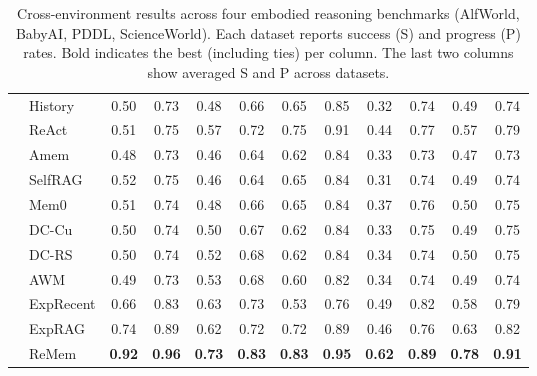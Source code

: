 \begin{table}[t!]
{\begin{tabular}{l l cc cc cc cc cc}
 & History & 0.50 & 0.73 & 0.48 & 0.66 & 0.65 & 0.85 & 0.32 & 0.74 & 0.49 & 0.74 \\
\cmidrule(lr){2-12}
 & ReAct & 0.51 & 0.75 & 0.57 & 0.72 & 0.75 & 0.91 & 0.44 & 0.77 & 0.57 & 0.79 \\
 & Amem & 0.48 & 0.73 & 0.46 & 0.64 & 0.62 & 0.84 & 0.33 & 0.73 & 0.47 & 0.73 \\
\cmidrule(lr){2-12}
 & SelfRAG & 0.52 & 0.75 & 0.46 & 0.64 & 0.65 & 0.84 & 0.31 & 0.74 & 0.49 & 0.74 \\
 & Mem0 & 0.51 & 0.74 & 0.48 & 0.66 & 0.65 & 0.84 & 0.37 & 0.76 & 0.50 & 0.75 \\
\cmidrule(lr){2-12}
 & DC-Cu & 0.50 & 0.74 & 0.50 & 0.67 & 0.62 & 0.84 & 0.33 & 0.75 & 0.49 & 0.75 \\
 & DC-RS & 0.50 & 0.74 & 0.52 & 0.68 & 0.62 & 0.84 & 0.34 & 0.74 & 0.50 & 0.75 \\
 & AWM & 0.49 & 0.73 & 0.53 & 0.68 & 0.60 & 0.82 & 0.34 & 0.74 & 0.49 & 0.74 \\
\cmidrule(lr){2-12}
 & ExpRecent & 0.66 & 0.83 & 0.63 & 0.73 & 0.53 & 0.76 & 0.49 & 0.82 & 0.58 & 0.79 \\
 & ExpRAG & 0.74 & 0.89 & 0.62 & 0.72 & 0.72 & 0.89 & 0.46 & 0.76 & 0.63 & 0.82 \\
 & ReMem & \textbf{0.92} & \textbf{0.96} & \textbf{0.73} & \textbf{0.83} & \textbf{0.83} & \textbf{0.95} & \textbf{0.62} & \textbf{0.89} & \textbf{0.78} & \textbf{0.91} \\
\bottomrule
\end{tabular}}
\caption{Cross-environment results across four embodied reasoning benchmarks (AlfWorld, BabyAI, PDDL, ScienceWorld). Each dataset reports success (S) and progress (P) rates. Bold indicates the best (including ties) per column. The last two columns show averaged S and P across datasets.}
\label{tab:multi_part}
\end{table}
